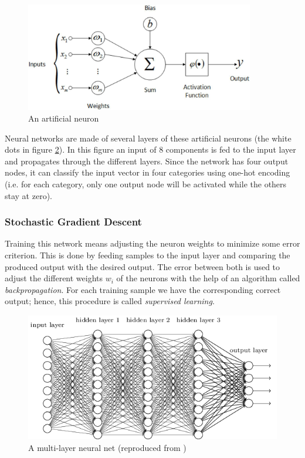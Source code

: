 \begin{figure}[htp]
    \centering
    \includegraphics[width=10cm]{images/neuron.jpeg}
    \caption{An artificial neuron}
    \label{fig:neuron}
\end{figure}

Neural networks \cite{nielsen2015neural} are made of several layers of these artificial neurons (the white dots in figure \ref{fig:neural_net}). In this figure an input of $8$ components is fed to the input layer and propagates through the different layers. Since the network has four output nodes, it can classify the input vector in four categories using one-hot encoding (i.e. for each category, only one output node will be activated while the others stay at zero).
\subsubsection{Stochastic Gradient Descent}
Training this network means adjusting the neuron weights to minimize some error criterion. This is done by feeding samples to the input layer and comparing the produced output with the desired output. The error between both is used to adjust the different weights $w_i$ of the neurons with the help of an algorithm called \emph{backpropagation}. For each training sample we have the corresponding correct output; hence, this procedure is called \emph{supervised learning}.\\

\begin{figure}[htp]
    \centering
    \includegraphics[width=12cm]{images/neural_net.png}
    \caption{A multi-layer neural net (reproduced from \cite{nielsen2015neural})}
    \label{fig:neural_net}
\end{figure}

